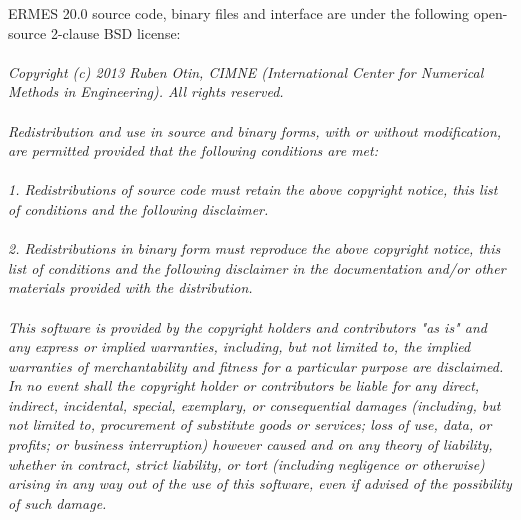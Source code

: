 ERMES 20.0 source code, binary files and interface are under the following open-source 2-clause BSD license:\\
\\
\textit{Copyright (c) 2013 Ruben Otin, CIMNE (International Center for Numerical Methods in Engineering). All rights reserved.}\\
\\
\textit{Redistribution and use in source and binary forms, with or without modification, are permitted provided that the following conditions are met:}\\
\\
\textit{1. Redistributions of source code must retain the above copyright notice, this list of conditions and the following disclaimer.}\\
\\
\textit{2. Redistributions in binary form must reproduce the above copyright notice, this list of conditions and the following disclaimer in the documentation and/or other materials provided with the distribution.}\\
\\
\textit{This software is provided by the copyright holders and contributors "as is" and any express or implied warranties, including, but not limited to, the implied warranties of merchantability and fitness for a particular purpose are disclaimed. In no event shall the copyright holder or contributors be liable for any direct, indirect, incidental, special, exemplary, or consequential damages (including, but not limited to, procurement of substitute goods or services; loss of use, data, or profits; or business interruption) however caused and on any theory of liability, whether in contract, strict liability, or tort (including negligence or otherwise) arising in any way out of the use of this software, even if advised of the possibility of such damage.}








